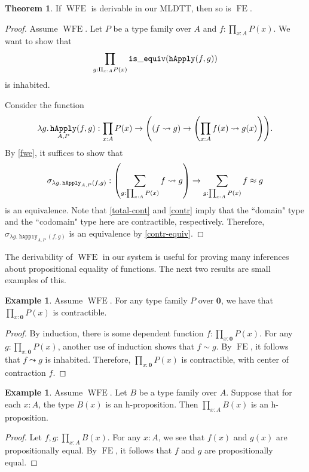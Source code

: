 \documentclass[10pt,letterpaper,cm]{nupset}
\theoremstyle{definition}
\newtheorem{exmp}[definition]{Example}
\theoremstyle{theorem}
\newtheorem{theorem}[definition]{Theorem}
\theoremstyle{remark}
\newcommand{\0}{\mathbf{0}}
\newcommand{\1}{\mathbf{1}}
\newcommand{\2}{\mathbf{2}}
\DeclareMathOperator{\happly}{\mathtt{hApply}}
\DeclareMathOperator{\isequiv}{\mathtt{is\_equiv}}
\DeclareMathOperator{\wfe}{\mathrm{WFE}}
\DeclareMathOperator{\sfe}{\mathrm{FE}}
\begin{document}
\begin{theorem}\label{wfe-sfe}
If $\wfe$ is derivable in our MLDTT, then so is $\sfe$.
\end{theorem}
\begin{proof}
Assume $\wfe.$  Let $P$ be a type family over $A$ and $f: \prod_{x:A}P(x)$.  
We want to show that $$\prod_{g: \Pi_{x:A} P(x)} \isequiv\mleft(\happly(f,g)\mright)$$ is inhabited.
\smallskip

Consider the function $$  \lambda g. \happly_{A,P}(f,g) : \prod_{x:A}P(x) \to \mleft(\mleft(f \leadsto g\mright) \to \mleft( \prod_{x:A} f(x) \leadsto g(x) \mright) \mright).$$
By \cref{fwe}, it suffices to show that $$\sigma_{ \lambda g. \happly_{A,P}(f,g)} : \mleft(\sum_{g : \prod_{x:A} P(x)} f \leadsto g \mright) \to \sum_{g: \prod_{x:A} P(x)} f\approx g $$ is an equivalence.   Note that \cref{total-cont} and \cref{contr} imply that the ``domain" type and the ``codomain" type here are contractible, respectively.  Therefore, $\sigma_{ \lambda g. \happly_{A,P}(f,g)}$ is an equivalence  by \cref{contr-equiv}.
\end{proof}

The derivability of $\wfe$ in our system is useful for proving many inferences about propositional equality of functions. The next two results are small examples of this.

\begin{exmp}\label{bot-cont}
Assume $\wfe$. For any type family $P$ over $\0$, we have that $\prod_{x:\0} P(x)$ is contractible. 
\end{exmp}
\begin{proof}
By induction, there is some dependent function $f : \prod_{x: \0} P(x)$. For any $g : \prod_{x:\0}P(x)$, another use of induction shows that $f \sim g$. By $\sfe$, it follows that $f \leadsto g$ is inhabited. Therefore, $\prod_{x:\0} P(x)$ is contractible, with center of contraction $f$. 
\end{proof}

\begin{exmp}\label{prod-prop}
Assume $\wfe$. Let $B$ be a type family over $A$. Suppose that for each $x:A$, the type $B(x)$ is an h-proposition. Then $\prod_{x:A}B(x)$ is an h-proposition.
\end{exmp}
\begin{proof}
Let $f, g: \prod_{x:A}B(x)$. For any $x:A$, we see that $f(x)$ and $g(x)$ are propositionally equal. By $\sfe$, it follows that $f$ and $g$ are propositionally equal. 
\end{proof}
\end{document}
